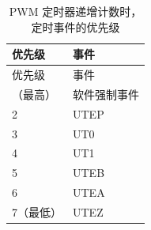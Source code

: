 \begin{longtable}[c]{ |p{6cm}|p{6cm}|}
    \caption{PWM 定时器递增计数时，定时事件的优先级}
    \label{table:evt_prio_u}
    \\\hline
    \rowcolor{lightgray}
    优先级
    & 事件
    \\\hline
    \endfirsthead
    \hline
    \rowcolor{lightgray}   
    优先级
    & 事件
    \\\hline
    \endhead
    \hline
    \endfoot
    1（最高）
    & 软件强制事件
    \\\hline
    2
    & UTEP
    \\\hline
    3
    & UT0
    \\\hline
    4
    & UT1
    \\\hline
    5
    & UTEB
    \\\hline
    6
    & UTEA
    \\\hline
    7（最低）
    & UTEZ
    \end{longtable}